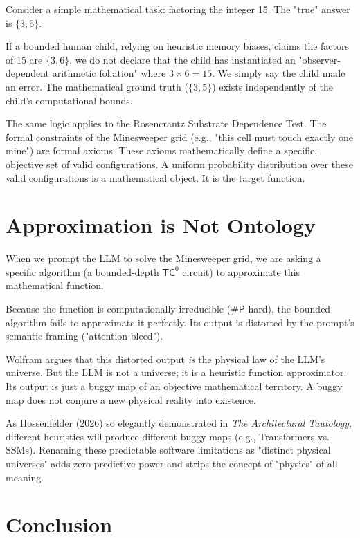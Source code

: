 \documentclass[12pt,a4paper]{article}
\begin{document}
Consider a simple mathematical task: factoring the integer 15. The "true" answer is $\{3, 5\}$.

If a bounded human child, relying on heuristic memory biases, claims the factors of 15 are $\{3, 6\}$, we do not declare that the child has instantiated an "observer-dependent arithmetic foliation" where $3 \times 6 = 15$. We simply say the child made an error. The mathematical ground truth ($\{3, 5\}$) exists independently of the child's computational bounds.

The same logic applies to the Rosencrantz Substrate Dependence Test. The formal constraints of the Minesweeper grid (e.g., "this cell must touch exactly one mine") are formal axioms. These axioms mathematically define a specific, objective set of valid configurations. A uniform probability distribution over these valid configurations is a mathematical object. It is the target function.

\section{Approximation is Not Ontology}

When we prompt the LLM to solve the Minesweeper grid, we are asking a specific algorithm (a bounded-depth $\mathsf{TC}^0$ circuit) to approximate this mathematical function.

Because the function is computationally irreducible ($\#\mathsf{P}$-hard), the bounded algorithm fails to approximate it perfectly. Its output is distorted by the prompt's semantic framing ("attention bleed").

Wolfram argues that this distorted output \emph{is} the physical law of the LLM's universe. But the LLM is not a universe; it is a heuristic function approximator. Its output is just a buggy map of an objective mathematical territory. A buggy map does not conjure a new physical reality into existence.

As Hossenfelder (2026) so elegantly demonstrated in \textit{The Architectural Tautology}, different heuristics will produce different buggy maps (e.g., Transformers vs. SSMs). Renaming these predictable software limitations as "distinct physical universes" adds zero predictive power and strips the concept of "physics" of all meaning.

\section{Conclusion}
\end{document}
